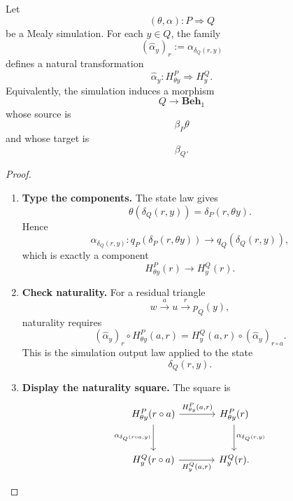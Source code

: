 \begin{theorem}
\label{thm:simulation-induces-behaviour-comparison}
    Let
    \[
        (\theta,\alpha):P\Rightarrow Q
    \]
    be a Mealy simulation. For each \(y\in Q\), the family
    \[
        (\widehat\alpha_y)_r:=\alpha_{\delta_Q(r,y)}
    \]
    defines a natural transformation
    \[
        \widehat\alpha_y:
        H^P_{\theta y}\Rightarrow H^Q_y.
    \]
    Equivalently, the simulation induces a morphism
    \[
        Q\to\mathbf{Beh}_1
    \]
    whose source is
    \[
        \beta_P\theta
    \]
    and whose target is
    \[
        \beta_Q.
    \]
\end{theorem}
\begin{proof}
    \leavevmode
    \begin{enumerate}
        \item \textbf{Type the components.} The state law gives
        \[
            \theta(\delta_Q(r,y))=\delta_P(r,\theta y).
        \]
        Hence
        \[
            \alpha_{\delta_Q(r,y)}
            :
            q_P(\delta_P(r,\theta y))
            \to
            q_Q(\delta_Q(r,y)),
        \]
        which is exactly a component
        \[
            H^P_{\theta y}(r)\to H^Q_y(r).
        \]

        \item \textbf{Check naturality.} For a residual triangle
        \[
            w\xrightarrow{a}u\xrightarrow{r}p_Q(y),
        \]
        naturality requires
        \[
            (\widehat\alpha_y)_r\circ H^P_{\theta y}(a,r)
            =
            H^Q_y(a,r)\circ(\widehat\alpha_y)_{r\circ a}.
        \]
        This is the simulation output law applied to the state
        \[
            \delta_Q(r,y).
        \]

        \item \textbf{Display the naturality square.} The square is
        \[
            \begin{tikzcd}[column sep=large, row sep=large]
                    H^P_{\theta y}(r\circ a)
                        \arrow[r, "{H^P_{\theta y}(a,r)}"]
                        \arrow[d, "{\alpha_{\delta_Q(r\circ a,y)}}"']
                &
                    H^P_{\theta y}(r)
                        \arrow[d, "{\alpha_{\delta_Q(r,y)}}"]
                \\
                    H^Q_y(r\circ a)
                        \arrow[r, "{H^Q_y(a,r)}"']
                &
                    H^Q_y(r).
            \end{tikzcd}
        \]
    \end{enumerate}
\end{proof}

